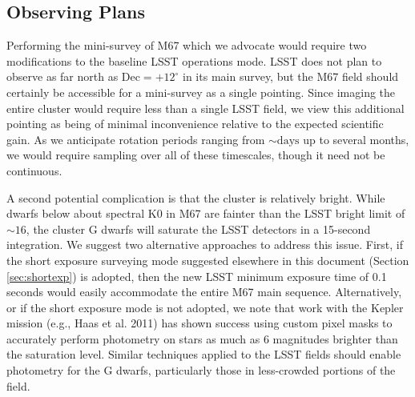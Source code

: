 \subsection{Observing Plans }

Performing the mini-survey of M67 which we advocate would require
two modifications to the baseline LSST operations mode. LSST does
not plan to observe as far north as $\mathrm{Dec}=+12^{\circ}$ in
its main survey, but the M67 field should certainly be accessible
for a mini-survey as a single pointing. Since imaging the entire cluster
would require less than a single LSST field, we view this additional
pointing as being of minimal inconvenience relative to the expected
scientific gain. As we anticipate rotation periods ranging from $\sim\mathrm{days}$
up to several months, we would require sampling over all of these
timescales, though it need not be continuous.

A second potential complication is that the cluster is relatively
bright. While dwarfs below about spectral K0 in M67 are fainter than
the LSST bright limit of $\sim16$, the cluster G dwarfs will saturate
the LSST detectors in a 15-second integration. We suggest two alternative
approaches to address this issue. First, if the short exposure surveying mode
suggested elsewhere in this document (Section \ref{sec:shortexp}) is adopted,
then the new LSST minimum exposure time of 0.1 seconds would easily
accommodate the entire M67 main sequence. Alternatively, or if the
short exposure mode is not adopted, we note that work with the Kepler
mission (e.g., Haas et al. 2011) has shown success using custom pixel
masks to accurately perform photometry on stars as much as 6 magnitudes
brighter than the saturation level. Similar techniques applied to
the LSST fields should enable photometry for the G dwarfs, particularly
those in less-crowded portions of the field.

